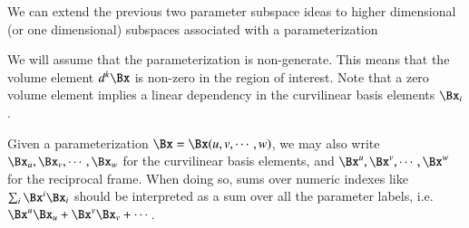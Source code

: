%
%

We can extend the previous two parameter subspace ideas to higher dimensional (or one dimensional) subspaces associated with a parameterization


We will assume that the parameterization is non-generate.
This means that the
volume element \( d^k \Bx \) is non-zero in the region of interest.
Note that a zero volume element implies a linear dependency in the curvilinear basis elements \( \Bx_i \).

Given a parameterization \( \Bx = \Bx(u,v,\cdots, w) \), we may also write
\( \Bx_u, \Bx_v, \cdots, \Bx_w \) for the curvilinear basis elements, and
\( \Bx^u, \Bx^v, \cdots, \Bx^w \) for the reciprocal frame.
When doing so, sums over numeric indexes like \( \sum_i \Bx^i \Bx_i \) should be interpreted as a sum over all the parameter labels, i.e. \( \Bx^u \Bx_u + \Bx^v \Bx_v + \cdots \).

